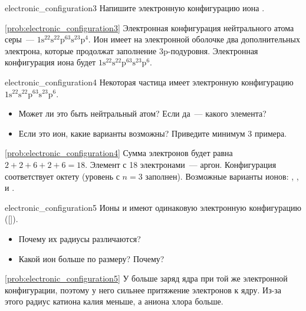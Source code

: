 \begin{problem}{}{electronic_configuration3}
    Напишите электронную конфигурацию иона .
    \begin{sol}{\ref{prob:electronic_configuration3}}
        Электронная конфигурация нейтрального атома серы~--- $1\mathrm{s}^22\mathrm{s}^22\mathrm{p}^63\mathrm{s}^23\mathrm{p}^4$. Ион  имеет на электронной оболочке два дополнительных электрона, которые продолжат заполнение 3p-подуровня. Электронная конфигурация иона будет $1\mathrm{s}^22\mathrm{s}^22\mathrm{p}^63\mathrm{s}^23\mathrm{p}^6$.
    \end{sol}
\end{problem}

\begin{problem}{}{electronic_configuration4}
    Некоторая частица имеет электронную конфигурацию $1\mathrm{s}^22\mathrm{s}^22\mathrm{p}^63\mathrm{s}^23\mathrm{p}^6$.
    \begin{itemize}
        \item Может ли это быть нейтральный атом? Если да~--- какого элемента?
        \item Если это ион, какие варианты возможны? Приведите минимум 3 примера.
    \end{itemize}
    \begin{sol}{\ref{prob:electronic_configuration4}}
        Сумма электронов будет равна $2 + 2 + 6 + 2 + 6 = 18$. Элемент с 18 электронами~--- аргон. Конфигурация соответствует октету (уровень с $n = 3$ заполнен). Возможные варианты ионов: , ,  и .
    \end{sol}
\end{problem}

\begin{problem}{}{electronic_configuration5}
    Ионы  и  имеют одинаковую электронную конфигурацию ([]).
    \begin{itemize}
        \item Почему их радиусы различаются?
        \item Какой ион больше по размеру? Почему?
    \end{itemize}
    \begin{sol}{\ref{prob:electronic_configuration5}}
        У  больше заряд ядра при той же электронной конфигурации, поэтому у него сильнее притяжение электронов к ядру. Из-за этого радиус катиона калия меньше, а аниона хлора больше.
    \end{sol}
\end{problem}

